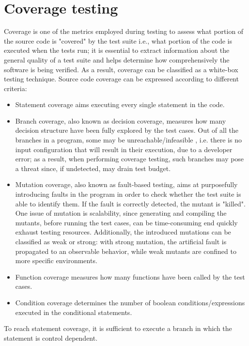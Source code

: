 \section{Coverage testing}
Coverage is one of the metrics employed during testing to assess what portion of the source code is "covered" by the test suite i.e., 
what portion of the code is executed when the tests run; it is essential to extract information about the general quality of a test suite and helps determine how comprehensively the software is being verified. As a result, coverage can be classified as a white-box testing technique.\newline
Source code coverage can be expressed according to different criteria:
\begin {itemize}
    \item Statement coverage aims executing every single statement in the code.
    \item Branch coverage, also known as decision coverage, measures how many decision structure have been fully explored by the test cases. Out of all the branches in a program, some may be unreachable/infeasible \cite{DBLP:conf/issta/YatesM89}, i.e. there is no input configuration that will result in their execution, due to a developer error; as a result, when performing coverage testing, such branches may pose a threat since, if undetected, may drain test budget.
    \item Mutation coverage, also known as fault-based testing, aims at purposefully introducing faults in the program in order to 
            check whether the test suite is able to identify them. If the fault is correctly detected, the mutant is "killed".
            One issue of mutation is scalability, since generating and compiling the mutants, before running the test cases, can be time-consuming end quickly exhaust testing resources. Additionally, the introduced mutations can be classified as weak or strong: with strong mutation, the artificial fault is propagated to an observable behavior, while weak mutants are confined to more 
            specific environments.
    \item Function coverage measures how many functions have been called by the test cases.
    \item Condition coverage determines the number of boolean conditions/expressions executed in the conditional statements.
\end {itemize}
To reach statement coverage, it is sufficient to execute a branch in which the statement is control dependent.

